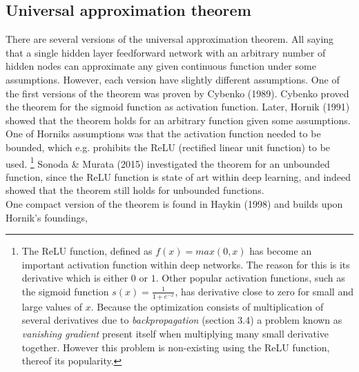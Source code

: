 \documentclass[12pt, letterpaper]{amsart}%
\begin{document}
\subsection{Universal approximation theorem}
There are several versions of the universal approximation theorem. All saying that a single hidden layer feedforward network with an arbitrary number of hidden nodes can approximate any given continuous function under some assumptions. However, each version have slightly different assumptions. One of the first versions of the theorem was proven by Cybenko (1989). Cybenko proved the theorem for the sigmoid function as activation function. Later, Hornik (1991) showed that the theorem holds for an arbitrary function given some assumptions. One of Horniks assumptions was that the activation function needed to be bounded, which e.g. prohibits the ReLU (rectified linear unit function) to be used. \footnote{The ReLU function, defined as $f(x) = max(0,x)$ has become an important activation function within deep networks. The reason for this is its derivative which is either $0$ or $1$. Other popular activation functions, such as the sigmoid function $s(x) = \frac{1}{1 + e^{-x}}$, has derivative close to zero for small and large values of $x$. Because the optimization consists of multiplication of several derivatives due to \textit{backpropagation} (section 3.4) a problem known as \textit{vanishing gradient} present itself when multiplying many small derivative together. However this problem is non-existing using the ReLU function, thereof its popularity.} Sonoda \& Murata (2015) investigated the theorem for an unbounded function, since the ReLU function is state of art within deep learning, and indeed showed that the theorem still holds for unbounded functions.
\\

One compact version of the theorem is found in Haykin (1998) and builds upon Hornik's foundings,

\newtheorem*{mydef}{Universal approximation theorem}
\end{document}

